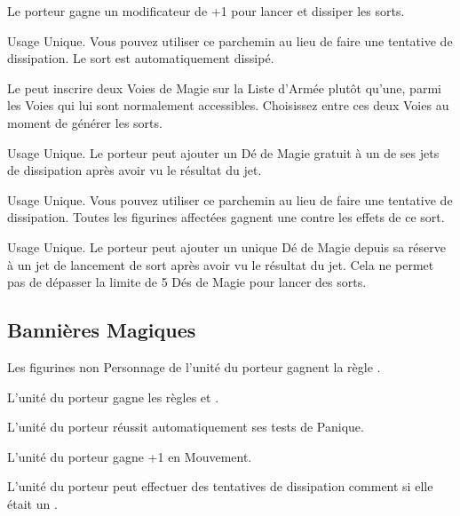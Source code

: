 \startpricelist

Le porteur gagne un modificateur de +1 pour lancer et dissiper les sorts.

Usage Unique. Vous pouvez utiliser ce parchemin au lieu de faire une tentative de dissipation. Le sort est automatiquement dissipé.

Le \wizard{} peut inscrire deux Voies de Magie sur la Liste d'Armée plutôt qu'une, parmi les Voies qui lui sont normalement accessibles. Choisissez entre ces deux Voies au moment de générer les sorts.

Usage Unique. Le porteur peut ajouter un Dé de Magie gratuit à un de ses jets de dissipation après avoir vu le résultat du jet.

\columnbreak

Usage Unique. Vous pouvez utiliser ce parchemin au lieu de faire une tentative de dissipation. Toutes les figurines affectées gagnent une  contre les effets de ce sort.

Usage Unique. Le porteur peut ajouter un unique Dé de Magie depuis sa réserve à un jet de lancement de sort après avoir vu le résultat du jet. Cela ne permet pas de dépasser la limite de 5 Dés de Magie pour lancer des sorts.

\endpricelist

\newpage
\hypertarget{magicalstandards}{\subsection{Bannières Magiques}}
\label{magical_standards}

\startpricelist

Les figurines non Personnage de l'unité du porteur gagnent la règle .

L'unité du porteur gagne les règles \swiftstride{} et \strider{}.

L'unité du porteur réussit automatiquement ses tests de Panique.

L'unité du porteur gagne +1 en Mouvement.

L'unité du porteur peut effectuer des tentatives de dissipation comment si elle était un \wizardmaster{}.

